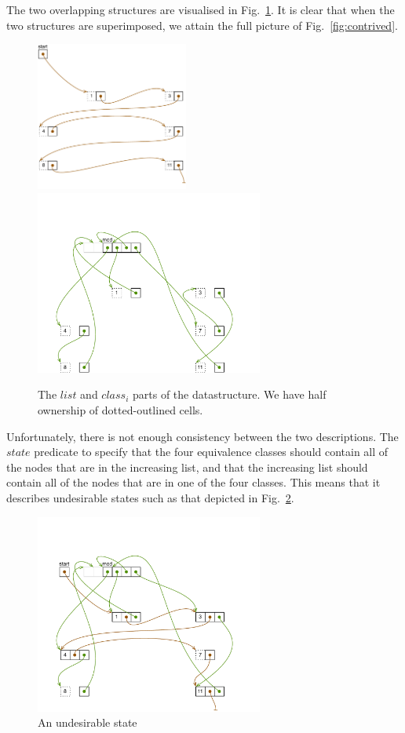 \documentclass[12pt,a4paper]{article}
\begin{document}
The two overlapping structures are visualised in Fig.~\ref{fig:twoparts}. It is clear that when the two structures are superimposed, we attain the full picture of Fig.~\ref{fig:contrived}.

\begin{figure}[tbp]
\centering
\includegraphics[width=50mm]{inclist.pdf} \hfil
\includegraphics[width=75mm]{classes.pdf}
\caption{The $list$ and $class_i$ parts of the datastructure. We have half ownership of dotted-outlined cells.}
\label{fig:twoparts}
\end{figure}

Unfortunately, there is not enough consistency between the two descriptions. The $state$ predicate to specify that the four equivalence classes should contain all of the nodes that are in the increasing list, and that the increasing list should contain all of the nodes that are in one of the four classes. This means that it describes undesirable states such as that depicted in Fig.~\ref{fig:undesirablestate}.

\begin{figure}[tbp]
\centering
\includegraphics[width=75mm]{undesirablestate.pdf}
\caption{An undesirable state}
\label{fig:undesirablestate}
\end{figure}
\end{document}
